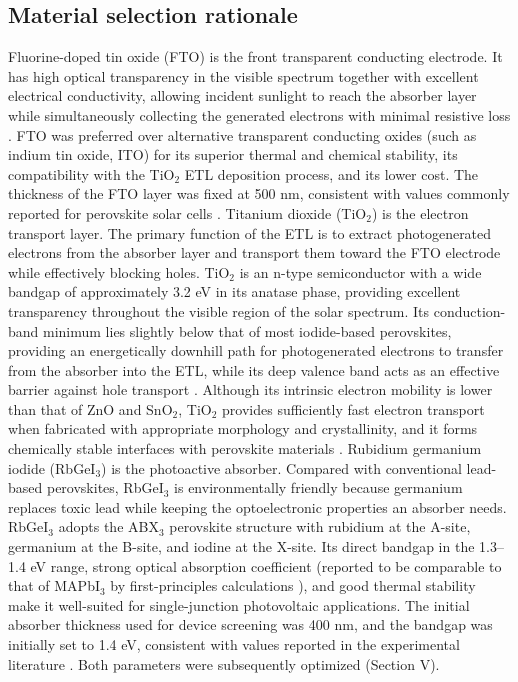 \documentclass[review]{elsarticle}
\begin{document}
\subsection{Material selection rationale}
Fluorine-doped tin oxide (FTO) is the front transparent conducting electrode. It has high optical transparency in the visible spectrum together with excellent electrical conductivity, allowing incident sunlight to reach the absorber layer while simultaneously collecting the generated electrons with minimal resistive loss \cite{r28}. FTO was preferred over alternative transparent conducting oxides (such as indium tin oxide, ITO) for its superior thermal and chemical stability, its compatibility with the TiO$_{2}$ ETL deposition process, and its lower cost. The thickness of the FTO layer was fixed at 500 nm, consistent with values commonly reported for perovskite solar cells \cite{r29}.
Titanium dioxide (TiO$_{2}$) is the electron transport layer. The primary function of the ETL is to extract photogenerated electrons from the absorber layer and transport them toward the FTO electrode while effectively blocking holes. TiO$_{2}$ is an n-type semiconductor with a wide bandgap of approximately 3.2 eV in its anatase phase, providing excellent transparency throughout the visible region of the solar spectrum. Its conduction-band minimum lies slightly below that of most iodide-based perovskites, providing an energetically downhill path for photogenerated electrons to transfer from the absorber into the ETL, while its deep valence band acts as an effective barrier against hole transport \cite{r30,r31}. Although its intrinsic electron mobility is lower than that of ZnO and SnO$_{2}$, TiO$_{2}$ provides sufficiently fast electron transport when fabricated with appropriate morphology and crystallinity, and it forms chemically stable interfaces with perovskite materials \cite{r32}.
Rubidium germanium iodide (RbGeI$_{3}$) is the photoactive absorber. Compared with conventional lead-based perovskites, RbGeI$_{3}$ is environmentally friendly because germanium replaces toxic lead while keeping the optoelectronic properties an absorber needs. RbGeI$_{3}$ adopts the ABX$_{3}$ perovskite structure with rubidium at the A-site, germanium at the B-site, and iodine at the X-site. Its direct bandgap in the 1.3--1.4 eV range, strong optical absorption coefficient (reported to be comparable to that of MAPbI$_{3}$ by first-principles calculations \cite{r17,r18}), and good thermal stability make it well-suited for single-junction photovoltaic applications. The initial absorber thickness used for device screening was 400 nm, and the bandgap was initially set to 1.4 eV, consistent with values reported in the experimental literature \cite{r14}. Both parameters were subsequently optimized (Section V).
\end{document}
